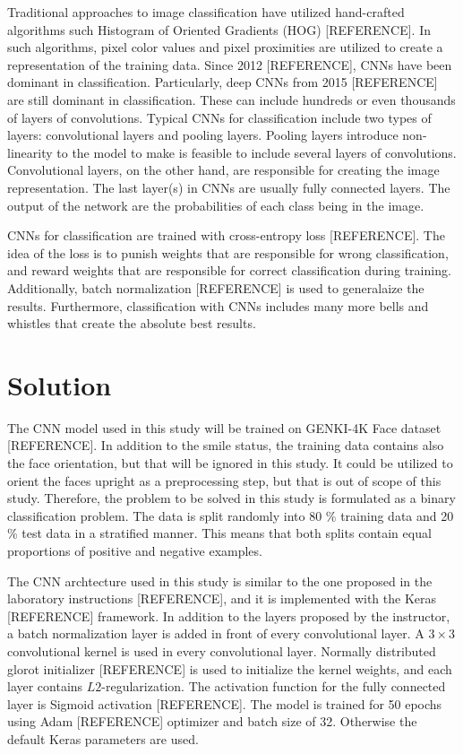 \documentclass{article}
\begin{document}
Traditional approaches to image classification have utilized
hand-crafted algorithms such Histogram of Oriented Gradients (HOG)
[REFERENCE]. In such algorithms, pixel color values and pixel
proximities are utilized to create a representation of the training
data. Since 2012 [REFERENCE], CNNs have been dominant in
classification. Particularly, deep CNNs from 2015 [REFERENCE] are
still dominant in classification. These can include hundreds or even
thousands of layers of convolutions. Typical CNNs for classification
include two types of layers: convolutional layers and pooling layers.
Pooling layers introduce non-linearity to the model to make is
feasible to include several layers of convolutions. Convolutional
layers, on the other hand, are responsible for creating the image
representation. The last layer(s) in CNNs are usually fully connected
layers. The output of the network are the probabilities of each class
being in the image.

CNNs for classification are trained with cross-entropy loss
[REFERENCE]. The idea of the loss is to punish weights that are
responsible for wrong classification, and reward weights that are
responsible for correct classification during training. Additionally,
batch normalization [REFERENCE] is used to generalaize the results.
Furthermore, classification with CNNs includes many more bells and
whistles that create the absolute best results.

\section{Solution}\label{sec:solution}
The CNN model used in this study will be trained on GENKI-4K Face
dataset [REFERENCE]. In addition to the smile status, the training
data contains also the face orientation, but that will be ignored in
this study. It could be utilized to orient the faces upright as a
preprocessing step, but that is out of scope of this study. Therefore,
the problem to be solved in this study is formulated as a binary
classification problem. The data is split randomly into 80 \% training
data and 20 \% test data in a stratified manner. This means that both
splits contain equal proportions of positive and negative examples.

The CNN archtecture used in this study is similar to the one proposed
in the laboratory instructions [REFERENCE], and it is implemented with
the Keras [REFERENCE] framework. In addition to the layers proposed by
the instructor, a batch normalization layer is added in front of every
convolutional layer. A $3 \times 3$ convolutional kernel is used in
every convolutional layer. Normally distributed glorot initializer
[REFERENCE] is used to initialize the kernel weights, and each layer
contains $L2$-regularization. The activation function for the fully
connected layer is Sigmoid activation [REFERENCE]. The model is
trained for 50 epochs using Adam [REFERENCE] optimizer and batch size
of 32. Otherwise the default Keras parameters are used.
\end{document}

